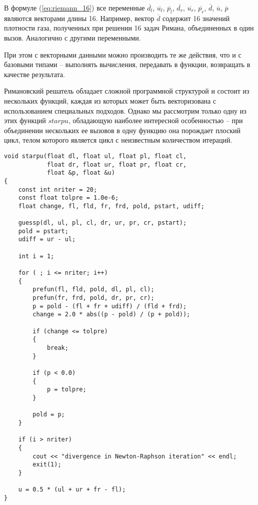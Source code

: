 \documentclass[
11pt,%
tightenlines,%
twoside,%
onecolumn,%
nofloats,%
nobibnotes,%
nofootinbib,%
superscriptaddress,%
noshowpacs,%
centertags]%
{revtex4}
\begin{document}
В формуле (\ref{eq:riemann_16}) все переменные $\overline{d_l}$, $\overline{u_l}$, $\overline{p_l}$, $\overline{d_r}$, $\overline{u_r}$, $\overline{p_r}$, $\overline{d}$, $\overline{u}$, $\overline{p}$ являются векторами длины 16.
Например, вектор $\overline{d}$ содержит 16 значений плотности газа, полученных при решении 16 задач Римана, объединенных в один вызов.
Аналогично с другими переменными.

При этом с векторными данными можно производить те же действия, что и с базовыми типами -- выполнять вычисления, передавать в функции, возвращать в качестве результата.

Римановский решатель обладает сложной программной структурой и состоит из нескольких функций, каждая из которых может быть векторизована с использованием специальных подходов.
Однако мы рассмотрим только одну из этих функций $starpu$, обладающую наиболее интересной особенностью -- при объединении нескольких ее вызовов в одну функцию она порождает плоский цикл, телом которого является цикл с неизвестным количеством итераций.

\begin{lstlisting}[caption={Оригинальная версия функции \texttt{starpu}.},label={lst:prac_riemann_starpu_orig}]
void starpu(float dl, float ul, float pl, float cl,
            float dr, float ur, float pr, float cr,
            float &p, float &u)
{
    const int nriter = 20;
    const float tolpre = 1.0e-6;
    float change, fl, fld, fr, frd, pold, pstart, udiff;

    guessp(dl, ul, pl, cl, dr, ur, pr, cr, pstart);
    pold = pstart;
    udiff = ur - ul;

    int i = 1;

    for ( ; i <= nriter; i++)
    {
        prefun(fl, fld, pold, dl, pl, cl);
        prefun(fr, frd, pold, dr, pr, cr);
        p = pold - (fl + fr + udiff) / (fld + frd);
        change = 2.0 * abs((p - pold) / (p + pold));

        if (change <= tolpre)
        {
            break;
        }

        if (p < 0.0)
        {
            p = tolpre;
        }

        pold = p;
    }

    if (i > nriter)
    {
        cout << "divergence in Newton-Raphson iteration" << endl;
        exit(1);
    }

    u = 0.5 * (ul + ur + fr - fl);
}
\end{lstlisting}

\ \\
\end{document}
